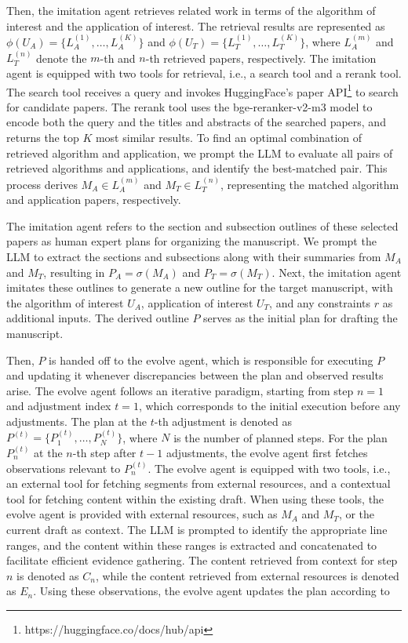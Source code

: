 \documentclass[manuscript,review,anonymous]{acmart}
\begin{document}
Then, the imitation agent retrieves related work in terms of the algorithm of interest and the application of interest. The retrieval results are represented as $\phi(U_A) = \{L_A^{(1)}, \ldots, L_A^{(K)}\}$ and $\phi(U_T) = \{L_T^{(1)}, \ldots, L_T^{(K)}\}$, where $L_A^{(m)}$ and $L_T^{(n)}$ denote the $m$-th and $n$-th retrieved papers, respectively. The imitation agent is equipped with two tools for retrieval, i.e., a search tool and a rerank tool. The search tool receives a query and invokes HuggingFace's paper API\footnote{https://huggingface.co/docs/hub/api} to search for candidate papers. The rerank tool uses the bge-reranker-v2-m3 \cite{chen2024bge} model to encode both the query and the titles and abstracts of the searched papers, and returns the top $K$ most similar results. To find an optimal combination of retrieved algorithm and application, we prompt the LLM to evaluate all pairs of retrieved algorithms and applications, and identify the best-matched pair. This process derives $M_A \in {L_A^{(m)}}$ and $M_T \in {L_T^{(n)}}$, representing the matched algorithm and application papers, respectively.

The imitation agent refers to the section and subsection outlines of these selected papers as human expert plans for organizing the manuscript. We prompt the LLM to extract the sections and subsections along with their summaries from $M_A$ and $M_T$, resulting in $P_A = \sigma(M_A)$ and $P_T = \sigma(M_T)$. Next, the imitation agent imitates these outlines to generate a new outline for the target manuscript, with the algorithm of interest $U_A$, application of interest $U_T$, and any constraints $r$ as additional inputs. The derived outline $P$ serves as the initial plan for drafting the manuscript.

Then, $P$ is handed off to the evolve agent, which is responsible for executing $P$ and updating it whenever discrepancies between the plan and observed results arise. The evolve agent follows an iterative paradigm, starting from step $n = 1$ and adjustment index $t = 1$, which corresponds to the initial execution before any adjustments. The plan at the $t$-th adjustment is denoted as $P^{(t)} = \{P_1^{(t)}, \ldots, P_N^{(t)}\}$, where $N$ is the number of planned steps. For the plan $P_n^{(t)}$ at the $n$-th step after $t-1$ adjustments, the evolve agent first fetches observations relevant to $P_n^{(t)}$. The evolve agent is equipped with two tools, i.e., an external tool for fetching segments from external resources, and a contextual tool for fetching content within the existing draft. When using these tools, the evolve agent is provided with external resources, such as $M_A$ and $M_T$, or the current draft as context. The LLM is prompted to identify the appropriate line ranges, and the content within these ranges is extracted and concatenated to facilitate efficient evidence gathering. The content retrieved from context for step $n$ is denoted as $C_n$, while the content retrieved from external resources is denoted as $E_n$. Using these observations, the evolve agent updates the plan according to
\end{document}
